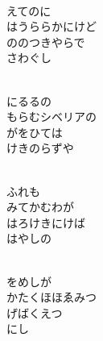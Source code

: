 \documentclass[10pt,b5j]{tarticle} %
\begin{document}
\begin{enumerate}
\begin{minipage}[c]{\blocksize}
        \vspace{\linespace}
        \item~\\
        えてのに\\
        はうららかにけど\\
        ののつきやらで\\
        さわぐし
        
        \vspace{\linespace}
        \item~\\
        にるるの\\
        もらむシベリアの\\
        がをひては\\
        けきのらずや
        
        \vspace{\linespace}
        \item~\\
        ふれも\\
        みてかむわが\\
        はろけきにけば\\
        はやしの
        
        \vspace{\linespace}
        \item~\\
        をめしが\\
        かたくほほゑみつ\\
        げばくえつ\\
        にし
    
    \end{minipage}
\end{enumerate} %
\end{document}
